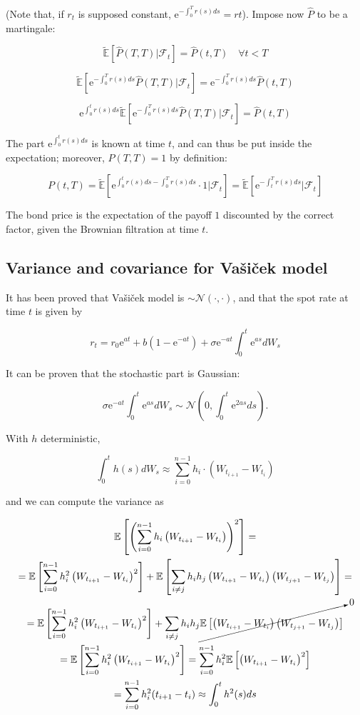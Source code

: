 \documentclass[oneside,titlepage,headinclude,12pt,a4paper,BCOR5mm,footinclude]{book}
\theoremstyle{defn}
\newcommand{\eexp}{\mathrm{e}}
\newcommand{\rnE}[1]{\mathbb{\tilde E}\left[ {#1} \right]}
\newcommand\NN{\mathcal{N}}
\begin{document}
(Note that,  if $r_t$  is supposed constant,  $\eexp^{-\int_0^T r(s)ds}  = rt$).
Impose now $\hat{P}$ to be a martingale:

\[
  \rnE{ \hat{P}(T,T) \Big| \mathcal{F}_t} = \hat{P}(t,T)\quad \forall t<T
\]

\[
  \rnE{ \eexp^{-\int_0^T r(s)ds}\hat{P}(T,T) \Big| \mathcal{F}_t} = \eexp^{-\int_0^T r(s)ds}\hat{P}(t,T)
\]

\[
  \eexp^{\int_0^t r(s)ds}\rnE{ \eexp^{-\int_0^T r(s)ds}\hat{P}(T,T) \Big| \mathcal{F}_t} = \hat{P}(t,T)
\]

The part  $\eexp^{\int_0^t r(s)ds}$ is  known at time $t$,  and can thus  be put
inside the expectation; moreover, $P(T,T)=1$ by definition:

\[
  P(t,T) = \rnE{ \eexp^{\int_0^tr(s)ds -\int_0^Tr(s)ds} \cdot 1 \Big| \mathcal{F}_t}
  = \rnE{\eexp^{-\int_t^T r(s)ds} \Big| \mathcal{F}_t}
\]

The bond price  is the expectation of  the payoff $1$ discounted  by the correct
factor, given the Brownian filtration at time $t$.

\subsection{Variance and covariance for Va\v{s}i\v{c}ek model}

It has been proved that Va\v{s}i\v{c}ek model is $\sim \NN(\cdot,\cdot)$, and
that the spot rate at time $t$ is given by

\[
  r_t = r_0 \eexp^{at}+b(1-\eexp^{-at}) + \sigma \eexp^{-at}\int_0^t\eexp^{as}dW_s
\]

It can be proven that the stochastic part is Gaussian:

\[
  \sigma\eexp^{-at} \int_0^t \eexp^{as}dW_s \sim \NN\left(0,\int_0^t\eexp^{2as}ds\right).
\]

With $h$ deterministic,

\[
  \int_0^t h(s)dW_s \approx \sum_{i=0}^{n-1} h_i \cdot (W_{t_{i+1}}-W_{t_i})
\]

and we can compute the variance as

\begin{gather*}
  \mathbb{E}\left[ \left( \sum_{i=0}^{n-1} h_i \left(W_{t_{i+1}} - W_{t_i} \right)\right)^2\right]
  = \\ = \mathbb{E}\left[ \sum_{i=0}^{n-1} h_i^2 \left(W_{t_{i+1}} - W_{t_i} \right)^2 \right]
  + \mathbb{E}\left[ \sum_{i\neq j} h_i h_j\left(W_{t_{i+1}} - W_{t_i} \right) \left(W_{t_{j+1}} - W_{t_j} \right)\right] =
  \\ = \mathbb{E}\left[ \sum_{i=0}^{n-1} h_i^2 \left(W_{t_{i+1}} - W_{t_i} \right)^2 \right]
  + \sum_{i \neq j} h_i h_j \cancelto{0}{\mathbb{E}\left[\left(W_{t_{i+1}} - W_{t_i} \right) \left(W_{t_{j+1}} - W_{t_j} \right)\right]} 
  \\ = \mathbb{E}\left[ \sum_{i=0}^{n-1} h_i^2 \left(W_{t_{i+1}} - W_{t_i} \right)^2 \right]
  =  \sum_{i=0}^{n-1} h_i^2 \mathbb{E}\left[ \left(W_{t_{i+1}} - W_{t_i} \right)^2 \right]
  \\ = \sum_{i=0}^{n-1} h_i^2 (t_{i+1}-t_i) \approx \int_0^t h^2(s)ds
\end{gather*}
\end{document}

